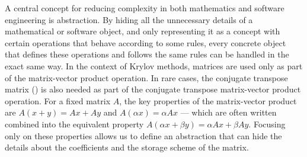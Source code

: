A central concept for reducing complexity in both mathematics and software
engineering is abstraction. By hiding all the unnecessary details of a
mathematical or software object, and only representing it as a concept with
certain operations that behave according to some rules, every concrete object
that defines these operations and follows the same rules can be
handled in the exact same way. In the context of Krylov methods, matrices are
used only as part of the matrix-vector product operation. In rare cases, the
conjugate transpose matrix () is also needed as part of
the conjugate transpose matrix-vector product operation. For a fixed matrix $A$,
the key properties of the matrix-vector product are  $A(x+y)
= Ax + Ay$ and  $A(\alpha x) = \alpha Ax$ --- which are
often written combined into the equivalent  property
$A(\alpha x + \beta y) = \alpha Ax + \beta Ay$. Focusing only on these
properties allows us to define an abstraction that can hide the details about
the coefficients and the storage scheme of the matrix.

